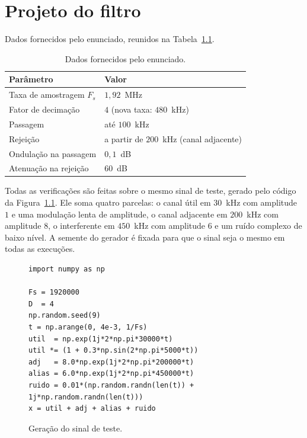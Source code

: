 \chapter{Projeto do filtro}
\label{cap:metodologia}

Dados fornecidos pelo enunciado, reunidos na Tabela~\ref{tab:dados}.

\begin{table}[htb]
\centering
\caption{Dados fornecidos pelo enunciado.}
\label{tab:dados}
\begin{tabular}{ll}
\hline
\textbf{Parâmetro} & \textbf{Valor} \\
\hline
Taxa de amostragem $F_s$ & $1{,}92$~MHz \\
Fator de decimação & $4$ (nova taxa: $480$~kHz) \\
Passagem & até $100$~kHz \\
Rejeição & a partir de $200$~kHz (canal adjacente) \\
Ondulação na passagem & $0{,}1$~dB \\
Atenuação na rejeição & $60$~dB \\
\hline
\end{tabular}
\end{table}

Todas as verificações são feitas sobre o mesmo sinal de teste, gerado pelo código da Figura~\ref{fig:codigo-sinal}. Ele soma quatro parcelas: o canal útil em $30$~kHz com amplitude $1$ e uma modulação lenta de amplitude, o canal adjacente em $200$~kHz com amplitude $8$, o interferente em $450$~kHz com amplitude $6$ e um ruído complexo de baixo nível. A semente do gerador é fixada para que o sinal seja o mesmo em todas as execuções.

\begin{figure}[htb]
\centering
\caption{Geração do sinal de teste.}
\label{fig:codigo-sinal}
\begin{minipage}{0.9\linewidth}
\begin{verbatim}
import numpy as np

Fs = 1920000
D  = 4
np.random.seed(9)
t = np.arange(0, 4e-3, 1/Fs)
util  = np.exp(1j*2*np.pi*30000*t)
util *= (1 + 0.3*np.sin(2*np.pi*5000*t))
adj   = 8.0*np.exp(1j*2*np.pi*200000*t)
alias = 6.0*np.exp(1j*2*np.pi*450000*t)
ruido = 0.01*(np.random.randn(len(t)) + 1j*np.random.randn(len(t)))
x = util + adj + alias + ruido
\end{verbatim}
\end{minipage}
\end{figure}

